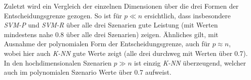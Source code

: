 \documentclass[
]{article}
\begin{document}
Zuletzt wird ein Vergleich der einzelnen Dimensionen über die drei
Formen der Entscheidungsgrenze gezogen. So ist für \(p \ll n\)
ersichtlich, dass insbesondere \textit{SVM-P} und \textit{SVM-R} über
alle drei Szenarien gute Leistung (mit Werten mindestens nahe 0.8 über
alle drei Szenarien) zeigen. Ähnliches gilt, mit Ausnahme der
polynomialen Form der Entscheidungsgrenze, auch für \(p \approx n\),
wobei hier auch \textit{K-NN} gute Werte zeigt (alle drei durchweg mit
Werten über 0.7). In den hochdimensionalen Szenarien \(p \gg n\) ist
einzig \textit{K-NN} überzeugend, welcher auch im polynomialen Szenario
Werte über 0.7 aufweist.

\printbibliography
\end{document}
